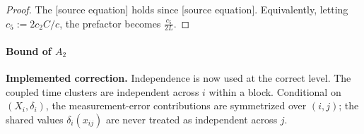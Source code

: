 \documentclass[twoside,11pt]{article}
\makeatletter
\newcommand{\implementedchange}[1]{%
  \par\smallskip\noindent
  {\color{revisionred}\textbf{Implemented correction.} #1}%
  \par\smallskip}
\newcommand{\discardlabel}[1]{}
\newcommand{\discardtwo}[2]{}
\newcommand{\legacyref}[1]{\textup{[source ref.]}}
\newcommand{\legacyeqref}[1]{\textup{[source equation]}}
\newenvironment{legacycomparison}{%
  \begingroup\color{legacygray}%
  \let\label\discardlabel
  \let\originallabel\discardlabel
  \let\ref\legacyref
  \let\pageref\legacyref
  \let\eqref\legacyeqref
  \let\cref\legacyref
  \let\Cref\legacyref
  \let\autoref\legacyref
  \let\aliasref\discardtwo
}{\endgroup}
\newcommand{\aliasref}[2]{%
  \@ifundefined{r@#2}{}{%
    \expandafter\let\csname r@#1\expandafter\endcsname\csname r@#2\endcsname}}
\makeatother
\begin{document}
\begin{legacycomparison}
\begin{proof}

The \eqref{in411} holds since \eqref{eq_120}. 
Equivalently, letting $c_5 := 2c_2C/c$, the prefactor becomes $\frac{c_5}{2L}$.
\end{proof}




\paragraph{Bound of $A_2$}
\implementedchange{Independence is now used at the correct level. The coupled time clusters are independent across $i$ within a block. Conditional on $(X_i,\delta_i)$, the measurement-error contributions are symmetrized over $(i,j)$; the shared values $\delta_i(x_{ij})$ are never treated as independent across $j$.}



\end{legacycomparison}
\end{document}
